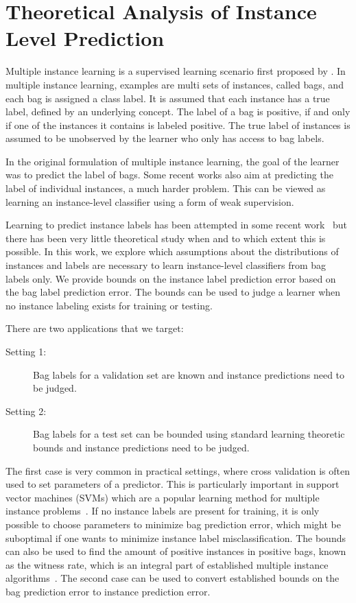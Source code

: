 \section{Theoretical Analysis of Instance Level Prediction}
Multiple instance learning is a supervised learning scenario first proposed by \citet{dietterich1997solving}.
In multiple instance learning, examples are multi sets of instances, called bags, and each bag is assigned a class label.
It is assumed that each instance has a true label, defined by an underlying concept. The label of a bag is positive, if and only if one of
the instances it contains is labeled positive. The true label of instances is assumed to be unobserved by the learner who only has access to bag labels.

In the original formulation of multiple instance learning, the goal of the learner
was to predict the label of bags. Some recent works also aim at predicting
the label of individual instances, a much harder problem.
This can be viewed as learning an instance-level classifier using a form of weak supervision.

Learning to predict instance labels has been attempted in some recent work~\citep{liconvex2010,zhang2002dd}
but there has been very little theoretical study when and to which extent this is possible.
In this work, we explore which assumptions about the distributions of instances and labels
are necessary to learn instance-level classifiers from bag labels only.
We provide bounds on the instance label prediction error based on the
bag label prediction error. The bounds can be used to judge a learner when no
instance labeling exists for training or testing.

There are two applications that we target:
\begin{description}
\item[Setting 1:] Bag labels for a validation set are known and instance predictions need to be judged.
\item[Setting 2:] Bag labels for a test set can be bounded using standard learning theoretic bounds and instance
predictions need to be judged.
\end{description}
The first case is very common in practical settings, where
cross validation is often used to set parameters of a predictor. This is
particularly important in support vector machines (SVMs) which are a popular
learning method for multiple instance problems~\citep{andrews2003support}.
If no instance labels are present for training, it is only possible to
choose parameters to minimize bag prediction error, which might be suboptimal if one
wants to minimize instance label misclassification. 
The bounds can also be used to find the amount of positive instances in positive bags,
known as the witness rate, which is an integral part of established multiple
instance algorithms~\citep{zhang2002dd,liconvex2010}.
The second case can be used to convert established bounds on the bag prediction error
to instance prediction error.

